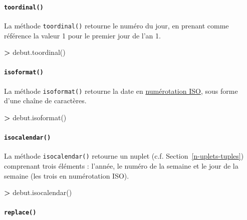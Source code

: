\documentclass[12pt,]{book}
\newenvironment{Shaded}{\begin{snugshade}}{\end{snugshade}}
\newcommand{\OperatorTok}[1]{\textcolor[rgb]{0.81,0.36,0.00}{\textbf{#1}}}
\newcommand{\NormalTok}[1]{#1}
\let\oldparagraph\paragraph
\renewcommand{\paragraph}[1]{\oldparagraph{#1}\mbox{}}
\numberwithin{equation}{section}
\numberwithin{countremarque}{section}
\begin{document}
\paragraph{\texorpdfstring{\texttt{toordinal()}}{toordinal()}}\label{toordinal}

La méthode \texttt{toordinal()} retourne le numéro du jour, en prenant
comme référence la valeur 1 pour le premier jour de l'an 1.

\begin{Shaded}
\begin{Highlighting}[]
\OperatorTok{>}\NormalTok{ debut.toordinal()}
\end{Highlighting}
\end{Shaded}

\paragraph{\texorpdfstring{\texttt{isoformat()}}{isoformat()}}\label{isoformat}

La méthode \texttt{isoformat()} retourne la date en
\href{https://fr.wikipedia.org/wiki/Num\%C3\%A9rotation_ISO_des_semaines}{numérotation
ISO}, sous forme d'une chaîne de caractères.

\begin{Shaded}
\begin{Highlighting}[]
\OperatorTok{>}\NormalTok{ debut.isoformat()}
\end{Highlighting}
\end{Shaded}

\paragraph{\texorpdfstring{\texttt{isocalendar()}}{isocalendar()}}\label{isocalendar}

La méthode \texttt{isocalendar()} retourne un nuplet (c.f.
Section~\ref{n-uplets-tuples}) comprenant trois éléments : l'année, le
numéro de la semaine et le jour de la semaine (les trois en numérotation
ISO).

\begin{Shaded}
\begin{Highlighting}[]
\OperatorTok{>}\NormalTok{ debut.isocalendar()}
\end{Highlighting}
\end{Shaded}

\paragraph{\texorpdfstring{\texttt{replace()}}{replace()}}\label{replace}
\end{document}
